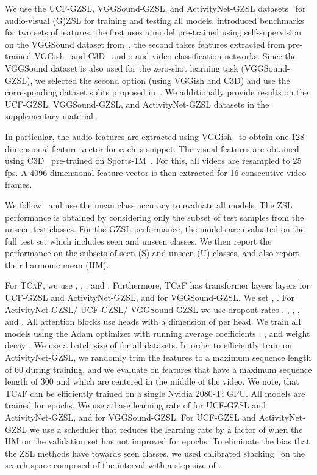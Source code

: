 \documentclass[runningheads]{llncs}
\newcommand{\mypara}[1]{\noindent{\bf{#1}}}
\newcommand{\modelName}{\textsc{TCaF}\xspace}
\newcommand{\activity}{{ActivityNet-GZSL}\xspace}
\newcommand{\ucf}{{UCF-GZSL}\xspace}
\newcommand{\vgg}{{VGGSound-GZSL}\xspace}
\newcommand{\selaactivity}{{ActivityNet-GZSL}\xspace}
\newcommand{\selaucf}{{UCF-GZSL}\xspace}
\newcommand{\selavgg}{{VGGSound-GZSL}\xspace}
\begin{document}
\mypara{Datasets.}
We use the \ucf, \vgg, and \activity datasets~\cite{mercea2022} for audio-visual (G)ZSL for training and testing all models. \cite{mercea2022} introduced benchmarks for two sets of features, the first uses a model pre-trained using self-supervision on the VGGSound dataset from~\cite{asano2020labelling}, the second takes features extracted from pre-trained VGGish~\cite{hershey2017cnn} and C3D~\cite{tran2015learning} audio and video classification networks. Since the VGGSound dataset is also used for the zero-shot learning task (\selavgg), we selected the second option (using VGGish and C3D) and use the corresponding dataset splits proposed in~\cite{mercea2022}. We additionally provide results on the \selaucf, \selavgg, and \selaactivity datasets in the supplementary material.

In particular, the audio features are extracted using VGGish~\cite{hershey2017cnn} to obtain one 128-dimensional feature vector for each \,s snippet. The 
visual features are obtained using C3D~\cite{tran2015learning} pre-trained on Sports-1M~\cite{KarpathyCVPR14}.
For this, all videos are resampled to 25\,fps. A 4096-dimensional feature vector is then extracted for 16 consecutive video frames.


\mypara{Evaluation metrics.}
We follow~\cite{xian2018zero,mercea2022} and use the mean class accuracy to evaluate all models. The ZSL performance is obtained by considering only the subset of test samples from the unseen test classes. For the GZSL performance, the models are evaluated on the full test set which includes seen and unseen classes. We then report the performance on the subsets of seen (S) and unseen (U) classes, and also report their harmonic mean (HM).


\mypara{Implementation details.} 
For \modelName, we use , , ,  and . Furthermore, \modelName has  transformer layers layers for \ucf and \activity, and  for \vgg. We set , . For \activity / \ucf / \vgg we use dropout rates , , , , and . All attention blocks use  heads with a dimension of  per head. 
We train all models using the Adam optimizer \cite{kingma2014adam} with running average coefficients , , and weight decay . We use a batch size of  for all datasets. 
In order to efficiently train on \activity, we randomly trim the features to a maximum sequence length of 60 during training, and we evaluate on features that have a maximum sequence length of 300 and which are centered in the middle of the video. We note, that \modelName{} can be efficiently trained on a single Nvidia 2080-Ti GPU.
All models are trained for  epochs.  We use a base learning rate of  for \ucf and \activity, and  for \vgg. For \ucf and \activity we use a scheduler that reduces the learning rate by a factor of  when the HM on the validation set has not improved for  epochs. To eliminate the bias that the ZSL methods have towards seen classes, we used calibrated stacking~\cite{chao2016empirical} on the search space composed of the interval  with a step size of . 
\end{document}
